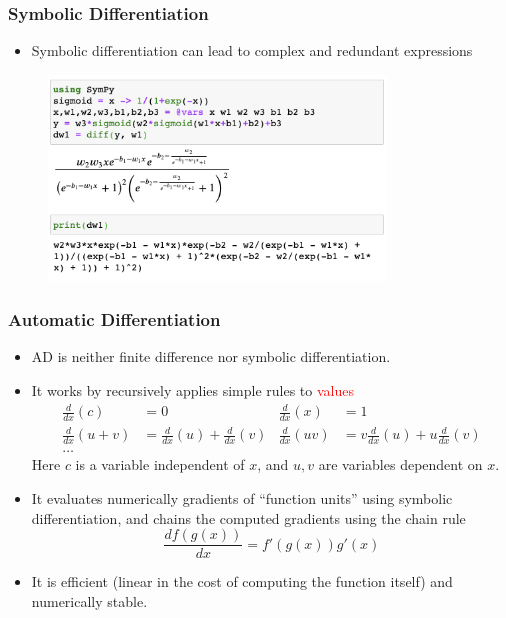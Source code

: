 \documentclass{beamer}
\begin{document}
\begin{frame}
	\frametitle{Symbolic Differentiation}
	\begin{itemize}
		\item Symbolic differentiation can lead to complex and redundant expressions
	\end{itemize}
	\begin{figure}[hbt]
		\centering
		\includegraphics[width=0.8\textwidth]{figures/symbolic}
	\end{figure}
\end{frame}

\begin{frame}
	\frametitle{Automatic Differentiation}

	\begin{itemize}
		\item AD is neither finite difference nor symbolic differentiation.
		\item It works by recursively applies simple rules to \textcolor{red}{values}
		      \begin{align*}
			      \frac{d}{dx}(c)   & = 0                                 & \frac{d}{dx}(x)  & = 1                                 \\
			      \frac{d}{dx}(u+v) & = \frac{d}{dx}(u) + \frac{d}{dx}(v) & \frac{d}{dx}(uv) & = v\frac{d}{dx}(u)+u\frac{d}{dx}(v) \\
			      \ldots
		      \end{align*}
		      Here $c$ is a variable independent of $x$, and $u, v$ are variables dependent on $x$.

		\item It evaluates numerically gradients of ``function units'' using symbolic differentiation, and chains the computed gradients using the chain rule
		      $$\frac{df(g(x))}{dx} = f'(g(x)) g'(x)$$
		\item It is efficient (linear in the cost of computing the function itself) and numerically stable.
	\end{itemize}

\end{frame}
\end{document}
